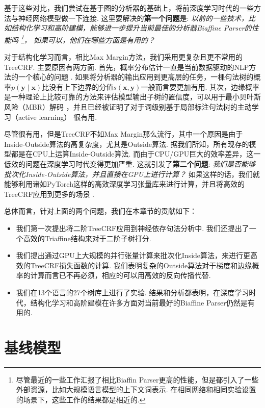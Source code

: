 基于这些对比，我们尝试在基于图的分析器的基础上，将前深度学习时代的一些方法与神经网络模型做一下连接.
这里要解决的\textbf{第一个问题}是:
\emph{
  以前的一些技术，比如结构化学习和高阶建模，能够进一步提升当前最佳的分析器Biaffine Parser的性能吗
  \footnote{
    尽管最近的一些工作汇报了相比Biaffin Parser更高的性能，但是都引入了一些外部资源，比如大规模语言模型的上下文词表示.
    在相同网络和相同实验设置的场景下，这些工作的结果都是相近的.
  }，
  如果可以，他们在哪些方面是有用的？
}

对于结构化学习而言，相比Max Margin方法，我们采用更复杂且更不常用的TreeCRF.
主要原因有两方面.
首先，概率分布估计一直是当前数据驱动的NLP方法的一个核心的问题 \citep{le-zuidema-2014-inside}.
如果将分析器的输出应用到更高层的任务，一棵句法树的概率$p(\boldsymbol{y}\mid\boldsymbol{x})$比没有上下边界的分值$s (\boldsymbol{x},\boldsymbol{y})$一般而言要更加有用.
其次，边缘概率是一种理论上比较可靠的方法来评估模型输出子树的置信度，可以用于最小贝叶斯风险（MBR）解码 \citep{smith-smith-2007-probabilistic}，并且已经被证明了对于词级别基于局部标注句法树的主动学习（active learning） \citep{li-etal-2016-active}很有用.

尽管很有用，但是TreeCRF不如Max Margin那么流行，其中一个原因是由于Inside-Outside算法的高复杂度，尤其是Outside算法.
据我们所知，所有现存的模型都是在CPU上运算Inside-Outside算法.
而由于CPU/GPU巨大的效率差异，这一低效的问题在深度学习时代变得更加严重.
这就引发了\textbf{第二个问题}:
\emph{我们是否能够批次化Inside-Outside算法，并且直接在GPU上进行计算？}
如果这样的话，我们就能够利用诸如PyTorch这样的高效深度学习张量库来进行计算，并且将高效的TreeCRF应用到更多的场景 \citep{cai-etal-2017-crf,le-zuidema-2014-inside}.

总体而言，针对上面的两个问题，我们在本章节的贡献如下：
\begin{itemize}
  \item 我们第一次提出将二阶TreeCRF应用到神经依存句法分析中.
        我们还提出了一个高效的Triaffine结构来对于二阶子树打分.
  \item 我们提出通过GPU上大规模的并行张量计算来批次化Inside算法，来进行更高效的TreeCRF损失函数的计算.
        我们表明复杂的Outside算法对于梯度和边缘概率的计算而言已不再必须，相应的可以用高效的反向传播代替.
  \item 我们在13个语言的27个树库上进行了实验.
        结果和分析都表明，在深度学习时代，结构化学习和高阶建模在许多方面对当前最好的Biaffine Parser仍然是有用的.
\end{itemize}

\section{基线模型}
\label{sec:dep-basic-model}

